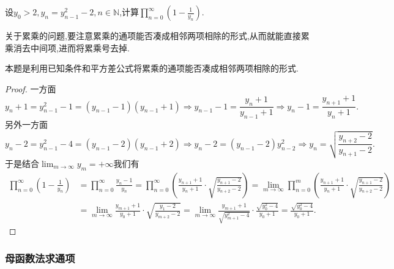\documentclass[lang=cn,newtx,10pt,scheme=chinese]{elegantbook}
\begin{document}
\begin{example}
设\(y_0>2,y_n=y_{n - 1}^{2}-2,n\in\mathbb{N}\),计算\(\prod_{n = 0}^{\infty}(1 - \frac{1}{y_n})\).  
\end{example}
\begin{note}
关于累乘的问题,要注意累乘的通项能否凑成相邻两项相除的形式,从而就能直接累乘消去中间项,进而将累乘号去掉.

本题是利用已知条件和平方差公式将累乘的通项能否凑成相邻两项相除的形式.
\end{note}
\begin{proof}
一方面
\[
y_n + 1=y_{n - 1}^{2}-1=(y_{n - 1}-1)(y_{n - 1}+1)\Rightarrow y_{n - 1}-1=\frac{y_n + 1}{y_{n - 1}+1}\Rightarrow y_n - 1=\frac{y_{n + 1}+1}{y_n + 1}.
\]
另外一方面
\[
y_n - 2=y_{n - 1}^{2}-4=(y_{n - 1}-2)(y_{n - 1}+2)\Rightarrow y_n - 2=(y_{n - 1}-2)y_{n - 2}^{2}\Rightarrow y_n=\sqrt{\frac{y_{n + 2}-2}{y_{n + 1}-2}}.
\]
于是结合\(\lim_{m\rightarrow\infty}y_m = +\infty\)我们有
\begin{align*}
\prod_{n = 0}^{\infty}\left(1-\frac{1}{y_n}\right)&=\prod_{n=0}^{\infty}{\frac{y_n-1}{y_n}}=\prod_{n = 0}^{\infty}\left(\frac{y_{n + 1}+1}{y_n + 1}\cdot\sqrt{\frac{y_{n + 1}-2}{y_{n + 2}-2}}\right)
=\lim_{m\rightarrow\infty}\prod_{n = 0}^{m}\left(\frac{y_{n + 1}+1}{y_n + 1}\cdot\sqrt{\frac{y_{n + 1}-2}{y_{n + 2}-2}}\right)\\
&=\lim_{m\rightarrow\infty}\frac{y_{m + 1}+1}{y_0 + 1}\cdot\sqrt{\frac{y_1 - 2}{y_{m + 2}-2}}
=\lim_{m\rightarrow\infty}\frac{y_{m + 1}+1}{\sqrt{y_{m + 1}^{2}-4}}\cdot\frac{\sqrt{y_0^{2}-4}}{y_0 + 1}
=\frac{\sqrt{y_0^{2}-4}}{y_0 + 1}.
\end{align*}
\end{proof}





\subsubsection{母函数法求通项}
\end{document}
